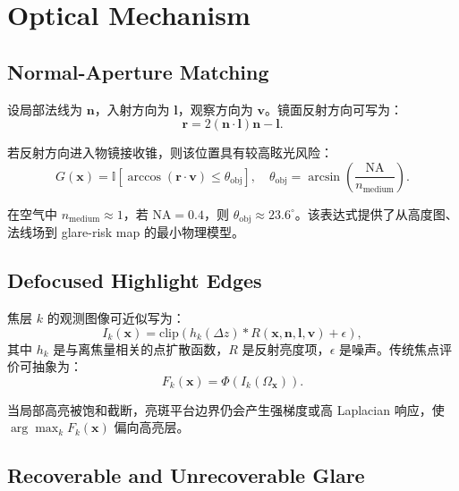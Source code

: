 \documentclass[11pt,a4paper]{ctexart}
\begin{document}
\section{Optical Mechanism}

\subsection{Normal-Aperture Matching}

设局部法线为 $\mathbf{n}$，入射方向为 $\mathbf{l}$，观察方向为 $\mathbf{v}$。镜面反射方向可写为：
\begin{equation}
\mathbf{r}=2(\mathbf{n}\cdot\mathbf{l})\mathbf{n}-\mathbf{l}.
\end{equation}

若反射方向进入物镜接收锥，则该位置具有较高眩光风险：
\begin{equation}
G(\mathbf{x})=\mathbb{I}\left[\arccos(\mathbf{r}\cdot\mathbf{v}) \leq \theta_{\mathrm{obj}}\right],
\quad
\theta_{\mathrm{obj}}=\arcsin\left(\frac{\mathrm{NA}}{n_{\mathrm{medium}}}\right).
\end{equation}

在空气中 $n_{\mathrm{medium}}\approx 1$，若 $\mathrm{NA}=0.4$，则 $\theta_{\mathrm{obj}}\approx 23.6^\circ$。该表达式提供了从高度图、法线场到 glare-risk map 的最小物理模型。

\subsection{Defocused Highlight Edges}

焦层 $k$ 的观测图像可近似写为：
\begin{equation}
I_k(\mathbf{x})=\mathrm{clip}\left( h_k(\Delta z) * R(\mathbf{x},\mathbf{n},\mathbf{l},\mathbf{v}) + \epsilon \right),
\end{equation}
其中 $h_k$ 是与离焦量相关的点扩散函数，$R$ 是反射亮度项，$\epsilon$ 是噪声。传统焦点评价可抽象为：
\begin{equation}
F_k(\mathbf{x})=\Phi\left(I_k(\Omega_{\mathbf{x}})\right).
\end{equation}

当局部高亮被饱和截断，亮斑平台边界仍会产生强梯度或高 Laplacian 响应，使 $\arg\max_k F_k(\mathbf{x})$ 偏向高亮层。

\subsection{Recoverable and Unrecoverable Glare}
\end{document}
